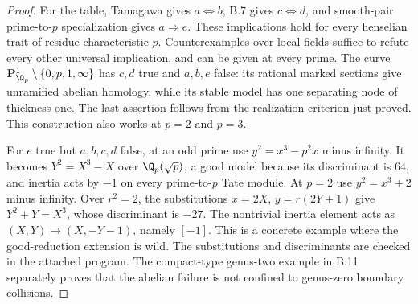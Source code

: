 \begin{proof}
For the table, Tamagawa gives $a\Leftrightarrow b$, B.7 gives
$c\Leftrightarrow d$, and smooth-pair prime-to-$p$ specialization gives
$a\Rightarrow e$. These implications hold for every henselian trait of
residue characteristic $p$. Counterexamples over local fields suffice to
refute every other universal implication, and can be given at every prime.
The curve $\mathbf P^1_{\Q_p}\setminus\{0,p,1,\infty\}$ has $c,d$ true
and $a,b,e$ false: its rational marked sections give unramified abelian
homology, while its stable model has one separating node of thickness one.
The last assertion follows from the realization criterion just proved.
This construction also works at $p=2$ and $p=3$.

For $e$ true but $a,b,c,d$ false, at an odd prime use
$y^2=x^3-p^2x$ minus infinity. It becomes $Y^2=X^3-X$ over
$\Q_p(\sqrt p)$, a good model because its discriminant is $64$, and
inertia acts by $-1$ on every prime-to-$p$ Tate module. At $p=2$ use
$y^2=x^3+2$ minus infinity. Over $r^2=2$, the substitutions
$x=2X$, $y=r(2Y+1)$ give $Y^2+Y=X^3$, whose discriminant is $-27$.
The nontrivial inertia element acts as $(X,Y)\mapsto(X,-Y-1)$, namely
$[-1]$. This is a concrete example where the good-reduction extension
is wild. The substitutions and discriminants are checked in the attached
program. The compact-type genus-two example in B.11 separately proves
that the abelian failure is not confined to genus-zero boundary collisions.
\end{proof}


